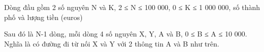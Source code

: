 Dòng đầu gồm 2 số nguyên N và K, 2 ≤ N ≤ 100 000, 0 ≤ K ≤ 1 000 000, số thành phố và lượng tiền (euros)

Sau đó là N-1 dòng, mỗi dòng 4 số nguyên X, Y, A và B, 0 ≤ B ≤ A ≤ 10 000. Nghĩa là có đường đi từ nối X và Y với 2 thông tin A và B như trên.